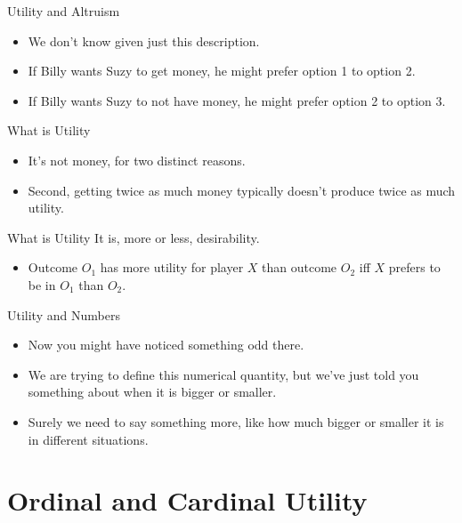 \documentclass[
  14pt,
  letterpaper,
  ignorenonframetext,
  aspectratio=169,
  handout]{beamer}
\providecommand{\tightlist}{%
  \setlength{\itemsep}{0pt}\setlength{\parskip}{0pt}}\usepackage{longtable,booktabs,array}
\let\olditem\item
\renewcommand{\item}{%
\olditem\vspace{6pt}}
\begin{document}
\begin{frame}{Utility and Altruism}
\protect\hypertarget{utility-and-altruism-1}{}
\begin{itemize}[<+->]
\tightlist
\item
  We don't know given just this description.
\item
  If Billy wants Suzy to get money, he might prefer option 1 to option
  2.
\item
  If Billy wants Suzy to not have money, he might prefer option 2 to
  option 3.
\end{itemize}
\end{frame}

\begin{frame}{What is Utility}
\protect\hypertarget{what-is-utility-3}{}
\begin{itemize}[<+->]
\tightlist
\item
  It's not money, for two distinct reasons.
\item
  Second, getting twice as much money typically doesn't produce twice as
  much utility.
\end{itemize}
\end{frame}

\begin{frame}{What is Utility}
\protect\hypertarget{what-is-utility-4}{}
It is, more or less, desirability.

\begin{itemize}[<+->]
\tightlist
\item
  Outcome \(O_1\) has more utility for player \(X\) than outcome \(O_2\)
  iff \(X\) prefers to be in \(O_1\) than \(O_2\).
\end{itemize}
\end{frame}

\begin{frame}{Utility and Numbers}
\protect\hypertarget{utility-and-numbers}{}
\begin{itemize}[<+->]
\tightlist
\item
  Now you might have noticed something odd there.
\item
  We are trying to define this numerical quantity, but we've just told
  you something about when it is bigger or smaller.
\item
  Surely we need to say something more, like how much bigger or smaller
  it is in different situations.
\end{itemize}
\end{frame}

\hypertarget{ordinal-and-cardinal-utility}{%
\section{Ordinal and Cardinal
Utility}\label{ordinal-and-cardinal-utility}}
\end{document}
